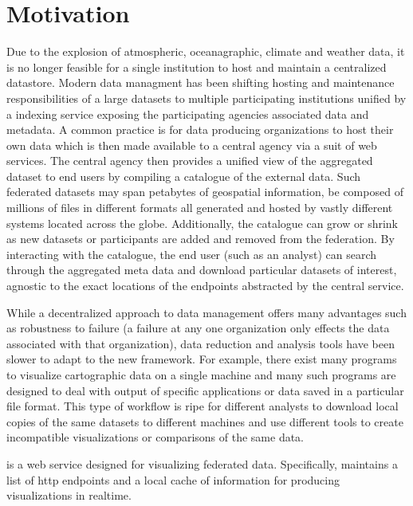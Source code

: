\section{Motivation}
\label{sec:motivation}
Due to the explosion of atmospheric, oceanagraphic, climate and
weather data, it is no longer feasible for a single institution to
host and maintain a centralized datastore. Modern data managment has
been shifting hosting and maintenance responsibilities of a large
datasets to multiple participating institutions unified by a indexing
service exposing the participating agencies associated data and
metadata. A common practice is for data producing organizations to
host their own data which is then made available to a central agency
via a suit of web services. The central agency then provides a unified
view of the aggregated dataset to end users by compiling a catalogue
of the external data. Such federated datasets may span petabytes of
geospatial information, be composed of millions of files in different
formats all generated and hosted by vastly different systems located
across the globe. Additionally, the catalogue can grow or shrink as
new datasets or participants are added and removed from the
federation. By interacting with the catalogue, the end user (such as
an analyst) can search through the aggregated meta data and download
particular datasets of interest, agnostic to the exact locations of
the endpoints abstracted by the central service.

While a decentralized approach to data management offers many
advantages such as robustness to failure (a failure at any one
organization only effects the data associated with that organization),
data reduction and analysis tools have been slower to adapt to the new
framework. For example, there exist many programs to visualize
cartographic data on a single machine and many such programs are
designed to deal with output of specific applications or data saved in
a particular file format. This type of workflow is ripe for different
analysts to download local copies of the same datasets to different
machines and use different tools to create incompatible visualizations
or comparisons of the same data.

\sciwms{} is a web service designed for visualizing federated
data. Specifically, \sciwms{} maintains a list of http endpoints and a local cache of information for producing visualizations in realtime.


